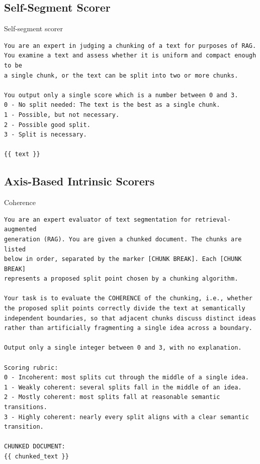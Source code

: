 \subsection{Self-Segment Scorer}

\begin{promptbox}{Self-segment scorer}
\begin{lstlisting}
You are an expert in judging a chunking of a text for purposes of RAG.
You examine a text and assess whether it is uniform and compact enough to be
a single chunk, or the text can be split into two or more chunks.

You output only a single score which is a number between 0 and 3.
0 - No split needed: The text is the best as a single chunk.
1 - Possible, but not necessary.
2 - Possible good split.
3 - Split is necessary.

{{ text }}
\end{lstlisting}
\end{promptbox}

\subsection{Axis-Based Intrinsic Scorers}

\begin{promptbox}{Coherence}
\begin{lstlisting}
You are an expert evaluator of text segmentation for retrieval-augmented
generation (RAG). You are given a chunked document. The chunks are listed
below in order, separated by the marker [CHUNK BREAK]. Each [CHUNK BREAK]
represents a proposed split point chosen by a chunking algorithm.

Your task is to evaluate the COHERENCE of the chunking, i.e., whether
the proposed split points correctly divide the text at semantically
independent boundaries, so that adjacent chunks discuss distinct ideas
rather than artificially fragmenting a single idea across a boundary.

Output only a single integer between 0 and 3, with no explanation.

Scoring rubric:
0 - Incoherent: most splits cut through the middle of a single idea.
1 - Weakly coherent: several splits fall in the middle of an idea.
2 - Mostly coherent: most splits fall at reasonable semantic transitions.
3 - Highly coherent: nearly every split aligns with a clear semantic transition.

CHUNKED DOCUMENT:
{{ chunked_text }}
\end{lstlisting}
\end{promptbox}

